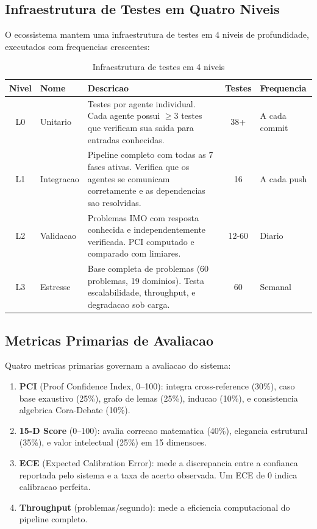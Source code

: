 \documentclass[5p]{elsarticle}
\begin{document}
\subsection{Infraestrutura de Testes em Quatro Niveis}

O ecossistema mantem uma infraestrutura de testes em 4 niveis de profundidade,
executados com frequencias crescentes:

\begin{table}[H]
 \centering
 \caption{Infraestrutura de testes em 4 niveis}
 \label{tab:testing}
 \footnotesize
 \begin{tabular}{clp{4.5cm}cp{2.5cm}}
 \toprule
 \textbf{Nivel} & \textbf{Nome} & \textbf{Descricao} & \textbf{Testes} & \textbf{Frequencia} \\
 \midrule
 L0 & Unitario & Testes por agente individual. Cada agente possui $\geq 3$ testes que verificam sua saida para entradas conhecidas. & 38+ & A cada commit \\
 \rowcolor{bluebg}
 L1 & Integracao & Pipeline completo com todas as 7 fases ativas. Verifica que os agentes se comunicam corretamente e as dependencias sao resolvidas. & 16 & A cada push \\
 L2 & Validacao & Problemas IMO com resposta conhecida e independentemente verificada. PCI computado e comparado com limiares. & 12-60 & Diario \\
 \rowcolor{greenbg}
 L3 & Estresse & Base completa de problemas (60 problemas, 19 dominios). Testa escalabilidade, throughput, e degradacao sob carga. & 60 & Semanal \\
 \bottomrule
 \end{tabular}
\end{table}

\subsection{Metricas Primarias de Avaliacao}

Quatro metricas primarias governam a avaliacao do sistema:

\begin{enumerate}[label=(\alph*)]
 \item \textbf{PCI} (Proof Confidence Index, 0--100): integra cross-reference
 (30\%), caso base exaustivo (25\%), grafo de lemas (25\%), inducao (10\%),
 e consistencia algebrica Cora-Debate (10\%).
 \item \textbf{15-D Score} (0--100): avalia correcao matematica (40\%), elegancia
 estrutural (35\%), e valor intelectual (25\%) em 15 dimensoes.
 \item \textbf{ECE} (Expected Calibration Error): mede a discrepancia entre a
 confianca reportada pelo sistema e a taxa de acerto observada. Um ECE de 0
 indica calibracao perfeita.
 \item \textbf{Throughput} (problemas/segundo): mede a eficiencia computacional
 do pipeline completo.
\end{enumerate}
\end{document}
